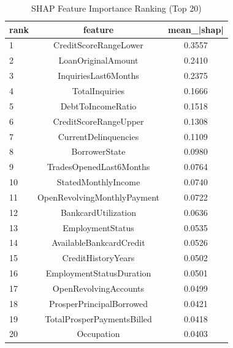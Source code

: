 \begin{table}
\centering
\caption{SHAP Feature Importance Ranking (Top 20)}
\label{tab:shap_ranking}
\begin{tabular}{lcc}
\toprule
rank & feature & mean_|shap| \\
\midrule
1 & CreditScoreRangeLower & 0.3557 \\
2 & LoanOriginalAmount & 0.2410 \\
3 & InquiriesLast6Months & 0.2375 \\
4 & TotalInquiries & 0.1666 \\
5 & DebtToIncomeRatio & 0.1518 \\
6 & CreditScoreRangeUpper & 0.1308 \\
7 & CurrentDelinquencies & 0.1109 \\
8 & BorrowerState & 0.0980 \\
9 & TradesOpenedLast6Months & 0.0764 \\
10 & StatedMonthlyIncome & 0.0740 \\
11 & OpenRevolvingMonthlyPayment & 0.0722 \\
12 & BankcardUtilization & 0.0636 \\
13 & EmploymentStatus & 0.0535 \\
14 & AvailableBankcardCredit & 0.0526 \\
15 & CreditHistoryYears & 0.0502 \\
16 & EmploymentStatusDuration & 0.0501 \\
17 & OpenRevolvingAccounts & 0.0499 \\
18 & ProsperPrincipalBorrowed & 0.0421 \\
19 & TotalProsperPaymentsBilled & 0.0418 \\
20 & Occupation & 0.0403 \\
\bottomrule
\end{tabular}
\end{table}

